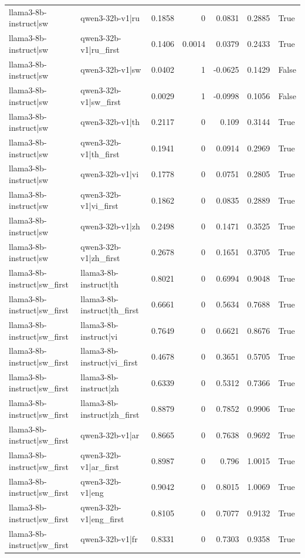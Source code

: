 \begin{table}
\begin{tabular}{l l r r r r l}
llama3-8b-instruct|sw & qwen3-32b-v1|ru & 0.1858 & 0 & 0.0831 & 0.2885 & True \\
llama3-8b-instruct|sw & qwen3-32b-v1|ru_first & 0.1406 & 0.0014 & 0.0379 & 0.2433 & True \\
llama3-8b-instruct|sw & qwen3-32b-v1|sw & 0.0402 & 1 & -0.0625 & 0.1429 & False \\
llama3-8b-instruct|sw & qwen3-32b-v1|sw_first & 0.0029 & 1 & -0.0998 & 0.1056 & False \\
llama3-8b-instruct|sw & qwen3-32b-v1|th & 0.2117 & 0 & 0.109 & 0.3144 & True \\
llama3-8b-instruct|sw & qwen3-32b-v1|th_first & 0.1941 & 0 & 0.0914 & 0.2969 & True \\
llama3-8b-instruct|sw & qwen3-32b-v1|vi & 0.1778 & 0 & 0.0751 & 0.2805 & True \\
llama3-8b-instruct|sw & qwen3-32b-v1|vi_first & 0.1862 & 0 & 0.0835 & 0.2889 & True \\
llama3-8b-instruct|sw & qwen3-32b-v1|zh & 0.2498 & 0 & 0.1471 & 0.3525 & True \\
llama3-8b-instruct|sw & qwen3-32b-v1|zh_first & 0.2678 & 0 & 0.1651 & 0.3705 & True \\
llama3-8b-instruct|sw_first & llama3-8b-instruct|th & 0.8021 & 0 & 0.6994 & 0.9048 & True \\
llama3-8b-instruct|sw_first & llama3-8b-instruct|th_first & 0.6661 & 0 & 0.5634 & 0.7688 & True \\
llama3-8b-instruct|sw_first & llama3-8b-instruct|vi & 0.7649 & 0 & 0.6621 & 0.8676 & True \\
llama3-8b-instruct|sw_first & llama3-8b-instruct|vi_first & 0.4678 & 0 & 0.3651 & 0.5705 & True \\
llama3-8b-instruct|sw_first & llama3-8b-instruct|zh & 0.6339 & 0 & 0.5312 & 0.7366 & True \\
llama3-8b-instruct|sw_first & llama3-8b-instruct|zh_first & 0.8879 & 0 & 0.7852 & 0.9906 & True \\
llama3-8b-instruct|sw_first & qwen3-32b-v1|ar & 0.8665 & 0 & 0.7638 & 0.9692 & True \\
llama3-8b-instruct|sw_first & qwen3-32b-v1|ar_first & 0.8987 & 0 & 0.796 & 1.0015 & True \\
llama3-8b-instruct|sw_first & qwen3-32b-v1|eng & 0.9042 & 0 & 0.8015 & 1.0069 & True \\
llama3-8b-instruct|sw_first & qwen3-32b-v1|eng_first & 0.8105 & 0 & 0.7077 & 0.9132 & True \\
llama3-8b-instruct|sw_first & qwen3-32b-v1|fr & 0.8331 & 0 & 0.7303 & 0.9358 & True \\

\end{tabular}
\end{table}

